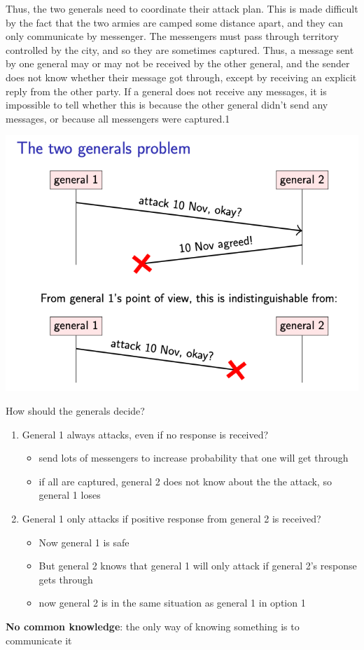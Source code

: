 \documentclass[11pt]{article}
\begin{document}
Thus, the two generals need to coordinate their attack plan. This is made difficult by the fact
that the two armies are camped some distance apart, and they can only communicate by messenger.
The messengers must pass through territory controlled by the city, and so they are sometimes
captured. Thus, a message sent by one general may or may not be received by the other general,
and the sender does not know whether their message got through, except by receiving an explicit
reply from the other party. If a general does not receive any messages, it is impossible to tell
whether this is because the other general didn’t send any messages, or because all messengers
were captured.1

\begin{center}
\includegraphics[width=.7\textwidth]{../images/DistributiveSystems/1.png}
\label{}
\end{center}

How should the generals decide?
\begin{enumerate}
\item General 1 always attacks, even if no response is received?
\begin{itemize}
\item send lots of messengers to increase probability that one will get through
\item if all are captured, general 2 does not know about the the attack, so general 1 loses
\end{itemize}
\item General 1 only attacks if positive response from general 2 is received?
\begin{itemize}
\item Now general 1 is safe
\item But general 2 knows that general 1 will only attack if general 2's response gets through
\item now general 2 is in the same situation as general 1 in option 1
\end{itemize}
\end{enumerate}
\textbf{No common knowledge}: the only way of knowing something is to communicate it
\end{document}
